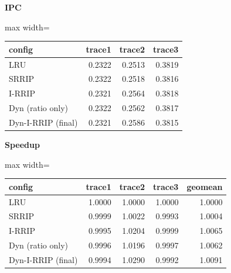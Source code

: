 \documentclass[10pt]{article}
\begin{document}
\begin{center}
\begin{minipage}[t]{0.48\linewidth}\centering
\textbf{IPC}\\[3pt]
\begin{adjustbox}{max width=\linewidth}
\begin{tabular}{@{}lrrr@{}}
\toprule
\textbf{config} & \textbf{trace1} & \textbf{trace2} & \textbf{trace3} \\
\midrule
LRU & 0.2322 & 0.2513 & 0.3819 \\
SRRIP & 0.2322 & 0.2518 & 0.3816 \\
I-RRIP & 0.2321 & 0.2564 & 0.3818 \\
Dyn (ratio only) & 0.2322 & 0.2562 & 0.3817 \\
Dyn-I-RRIP (final) & 0.2321 & 0.2586 & 0.3815 \\
\bottomrule
\end{tabular}
\end{adjustbox}
\end{minipage}\hfill
\begin{minipage}[t]{0.48\linewidth}\centering
\textbf{Speedup}\\[3pt]
\begin{adjustbox}{max width=\linewidth}
\begin{tabular}{@{}lrrrr@{}}
\toprule
\textbf{config} & \textbf{trace1} & \textbf{trace2} & \textbf{trace3} & \textbf{geomean} \\
\midrule
LRU & 1.0000 & 1.0000 & 1.0000 & 1.0000 \\
SRRIP & 0.9999 & 1.0022 & 0.9993 & 1.0004 \\
I-RRIP & 0.9995 & 1.0204 & 0.9999 & 1.0065 \\
Dyn (ratio only) & 0.9996 & 1.0196 & 0.9997 & 1.0062 \\
Dyn-I-RRIP (final) & 0.9994 & 1.0290 & 0.9992 & 1.0091 \\
\bottomrule
\end{tabular}
\end{adjustbox}
\end{minipage}
\end{center}
\medskip
\end{document}
